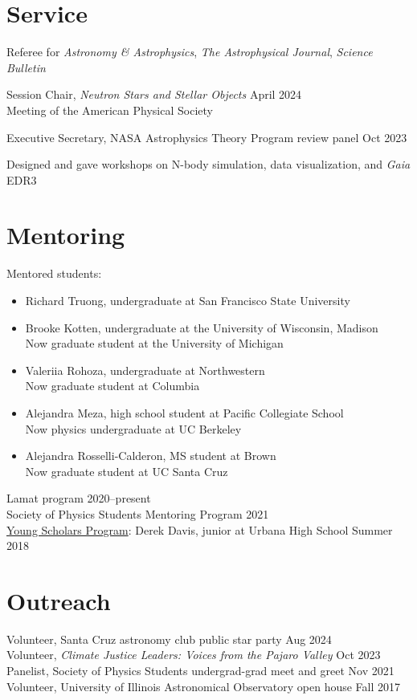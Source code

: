 \documentclass{cv}
\begin{document}
\section*{Service}
Referee for \textit{Astronomy \& Astrophysics}, \textit{The Astrophysical Journal}, \textit{Science Bulletin}

Session Chair, \textit{Neutron Stars and Stellar Objects} \hfill April 2024\\
Meeting of the American Physical Society

Executive Secretary, NASA Astrophysics Theory Program review panel \hfill Oct 2023

Designed and gave workshops on N-body simulation, data visualization, and \textit{Gaia} EDR3

\section*{Mentoring}
Mentored students:
\begin{itemize}[item-vspace=0pt,begin-vspace=0pt,left-margin=1.7em]
\item Richard Truong, undergraduate at San Francisco State University
\item Brooke Kotten, undergraduate at the University of Wisconsin, Madison\\Now graduate student at the University of Michigan
\item Valeriia Rohoza, undergraduate at Northwestern\\Now graduate student at Columbia
\item Alejandra Meza, high school student at Pacific Collegiate School\\Now physics undergraduate at UC Berkeley
\item Alejandra Rosselli-Calderon, MS student at Brown\\Now graduate student at UC Santa Cruz
\end{itemize}

Lamat program \hfill 2020--present\\
Society of Physics Students Mentoring Program \hfill 2021\\
\href{https://physics.illinois.edu/outreach/young-scholars}{Young Scholars Program}: Derek Davis, junior at Urbana High School \hfill Summer 2018

\ifdefined\withoutreach{}
\section*{Outreach}
Volunteer, Santa Cruz astronomy club public star party \hfill Aug 2024\\
Volunteer, \textit{Climate Justice Leaders: Voices from the Pajaro Valley} \hfill Oct 2023\\
Panelist, Society of Physics Students undergrad-grad meet and greet \hfill Nov 2021\\
Volunteer, University of Illinois Astronomical Observatory open house \hfill Fall 2017
\else\fi
\end{document}
